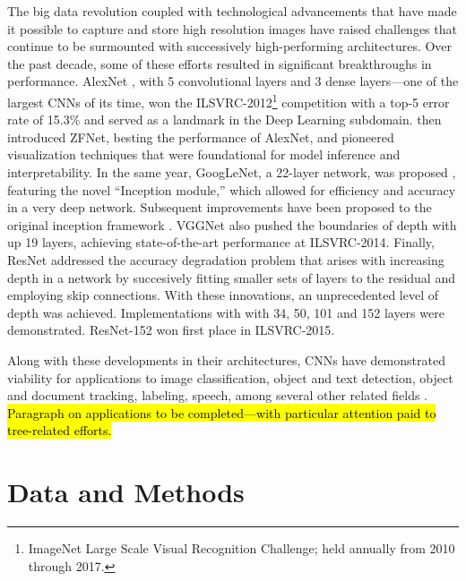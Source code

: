 \documentclass[11pt,twoside]{article}
\numberwithin{equation}{section}
\newcommand{\?}{\stackrel{?}{=}}
\begin{document}
The big data revolution coupled with technological advancements that have made it possible to capture and store high resolution images have raised challenges that continue to be surmounted with successively high-performing
architectures. Over the past decade, some of these efforts resulted in significant breakthroughs in performance. AlexNet \cite{krizhevsky2012imageneta}, with 5 convolutional layers and 3 dense layers---one of the largest CNNs of its time, won the ILSVRC-2012\footnote{ImageNet Large Scale Visual Recognition Challenge; held annually from 2010 through 2017.} competition with a top-5 error rate of 15.3\% and served as a landmark in the Deep Learning subdomain. \citet{zeiler2014visualizing} then introduced ZFNet, besting the performance of AlexNet, and pioneered visualization techniques that were foundational for model inference and interpretability.  In the same year, GoogLeNet, a 22-layer network, was proposed \cite{szegedy2014going}, featuring the novel ``Inception module,'' which allowed for efficiency and accuracy in a very deep network. Subsequent improvements have been proposed to the original inception framework \cite{szegedy2015rethinking,szegedy2016inceptionv4}.  VGGNet \cite{simonyan2015very} also pushed the boundaries of depth with up 19 layers, achieving state-of-the-art performance at ILSVRC-2014. Finally, ResNet \cite{he2015deep} addressed the accuracy degradation problem that arises with increasing depth in a network by succesively fitting smaller sets of layers to the residual and employing skip connections. With these innovations, an unprecedented level of depth was achieved. Implementations with with 34, 50, 101 and 152 layers were demonstrated. ResNet-152 won first place in ILSVRC-2015.

Along with these developments in their architectures, CNNs have demonstrated viability for applications to image
classification, object and text detection, object and document tracking, labeling, speech, among several other related
fields \cite{gu2018recent}. \hl{Paragraph on applications to be completed---with particular attention paid to tree-related efforts.}


\section{Data and Methods}
\end{document}
